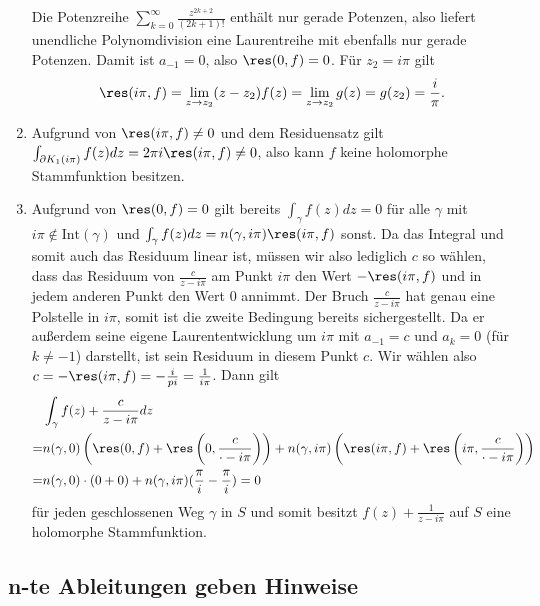 \documentclass[a4paper]{article}
\begin{document}
\begin{enumerate}
\begin{equation*}
	\end{equation*}
	Die Potenzreihe $\sum_{k = 0}^{\infty} \frac{z^{2k+2}}{(2k+1)!}$ enthält nur gerade Potenzen, also liefert unendliche Polynomdivision eine Laurentreihe mit ebenfalls nur gerade Potenzen. Damit ist $a_{-1} = 0$, also $\res(0, f) = 0$.
	Für $z_2 = i \pi$ gilt
	\begin{equation*}
		\res(i \pi, f) = \lim_{z \to z_2} (z - z_2) f(z) = \lim_{z \to z_2} g(z) = g(z_2) = \frac{i}{\pi} \text{.}
	\end{equation*}
	\item Aufgrund von $\res(i \pi, f) \neq 0$ und dem Residuensatz gilt  $\int_{\partial K_1(i \pi)} f(z) dz = 2 \pi i \res(i \pi, f) \neq 0$, also kann $f$ keine holomorphe Stammfunktion besitzen.
	\item Aufgrund von $\res(0, f) = 0$ gilt bereits $\int_\gamma f(z) dz = 0$ für alle $\gamma$ mit $i \pi \notin \mathrm{Int}(\gamma)$ und $\int_\gamma f(z) dz = n(\gamma, i \pi) \res(i \pi, f)$ sonst.
	Da das Integral und somit auch das Residuum linear ist, müssen wir also lediglich $c$ so wählen, dass das Residuum von $\frac{c}{z - i \pi}$ am Punkt $i \pi$ den Wert $- \res(i \pi, f)$ und in jedem anderen Punkt den Wert $0$ annimmt.
	Der Bruch $\frac{c}{z - i \pi}$ hat genau eine Polstelle in $i \pi$, somit ist die zweite Bedingung bereits sichergestellt. Da er außerdem seine eigene Laurententwicklung um $i \pi$ mit $a_{-1} = c$ und $a_k = 0$ (für $k \neq -1$) darstellt, ist sein Residuum in diesem Punkt $c$.
	Wir wählen also $c = - \res(i \pi, f) = - \frac{i}{pi} = \frac{1}{i \pi}$. Dann gilt
	\begin{align*}
		&\int_\gamma f(z) + \frac{c}{z - i \pi} dz \\ = & n(\gamma, 0) \left(\res(0, f) + \res\left(0, \frac{c}{\cdot - i \pi}\right)\right) + n(\gamma, i \pi) \left(\res(i \pi, f) + \res\left(i \pi, \frac{c}{\cdot - i \pi}\right)\right)\\ = & n(\gamma, 0) \cdot (0 + 0) + n(\gamma, i \pi) (\frac{\pi}{i} - \frac{\pi}{i}) = 0
	\end{align*}
	für jeden geschlossenen Weg $\gamma$ in $S$	und somit besitzt $f(z) + \frac{1}{z - i \pi}$ auf $S$ eine holomorphe Stammfunktion.

\end{enumerate}

\subsection{n-te Ableitungen geben Hinweise}
\end{document}
